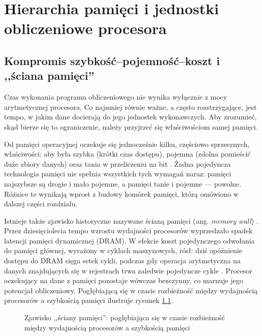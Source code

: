 \documentclass[a4paper,12pt]{book} %
\begin{document}
\chapter{Hierarchia pamięci i jednostki obliczeniowe procesora}
\label{chap:hierarchia}

\section{Kompromis szybkość--pojemność--koszt i ,,ściana pamięci''}
\label{sec:motywacja}

Czas wykonania programu obliczeniowego nie wynika wyłącznie z mocy arytmetycznej procesora. Co najmniej równie ważne, a często rozstrzygające, jest tempo, w jakim dane docierają do jego jednostek wykonawczych. Aby zrozumieć, skąd bierze się to ograniczenie, należy przyjrzeć się właściwościom samej pamięci.

Od pamięci operacyjnej oczekuje się jednocześnie kilku, częściowo sprzecznych, właściwości: aby była szybka (krótki czas dostępu), pojemna (zdolna pomieścić duże zbiory danych) oraz tania w przeliczeniu na bit \cite{drepper2007memory}. Żadna pojedyncza technologia pamięci nie spełnia wszystkich tych wymagań naraz: pamięci najszybsze są drogie i mało pojemne, a pamięci tanie i pojemne --- powolne. Różnice te wynikają wprost z budowy komórek pamięci, którą omówiono w dalszej części rozdziału.

Istnieje także zjawisko historyczne nazywane ścianą pamięci (ang. \emph{memory wall}) \cite{wulf1995memorywall}. Przez dziesięciolecia tempo wzrostu wydajności procesorów wyprzedzało spadek latencji pamięci dynamicznej (DRAM). W efekcie koszt pojedynczego odwołania do pamięci głównej, wyrażony w cyklach maszynowych, rósł: dziś opóźnienie dostępu do DRAM sięga setek cykli, podczas gdy operacja arytmetyczna na danych znajdujących się w rejestrach trwa zaledwie pojedyncze cykle \cite{hennessy2017architecture}. Procesor oczekujący na dane z pamięci pozostaje wówczas bezczynny, co marnuje jego potencjał obliczeniowy. Pogłębiającą się w czasie rozbieżność między wydajnością procesorów a szybkością pamięci ilustruje rysunek \ref{rys:memory-wall}.

\begin{figure}[t!]
\centering
{}
\caption{Zjawisko ,,ściany pamięci'': pogłębiająca się w czasie rozbieżność między wydajnością procesorów a szybkością pamięci}
\label{rys:memory-wall}
\end{figure}
\end{document}
